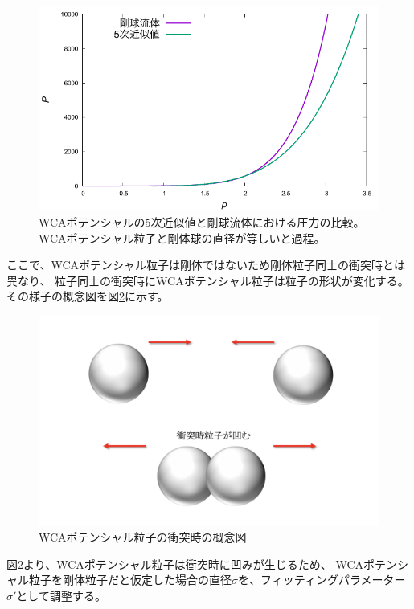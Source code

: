 \documentclass[titlepage]{jsreport}
\begin{document}
{{{\begin{figure}[htbp]
    \begin{center}
        \includegraphics[width=14cm]{fig/compare_previous-research.pdf}
    \end{center}
    \caption{WCAポテンシャルの5次近似値と剛球流体における圧力の比較。WCAポテンシャル粒子と剛体球の直径が等しいと過程。}
    \label{fig:compare_previous-research}
\end{figure}

ここで、WCAポテンシャル粒子は剛体ではないため剛体粒子同士の衝突時とは異なり、
粒子同士の衝突時にWCAポテンシャル粒子は粒子の形状が変化する。
その様子の概念図を図\ref{fig:WCA-collision}に示す。

\begin{figure}[htbp]
    \begin{center}
        \includegraphics[width=11.5cm]{fig/WCA-collision.png}
    \end{center}
    \caption{WCAポテンシャル粒子の衝突時の概念図}
    \label{fig:WCA-collision}
\end{figure}

\newpage
図\ref{fig:WCA-collision}より、WCAポテンシャル粒子は衝突時に凹みが生じるため、
WCAポテンシャル粒子を剛体粒子だと仮定した場合の直径$\sigma$を、フィッティングパラメーター${\sigma}'$として調整する。

}}}
\end{document}
